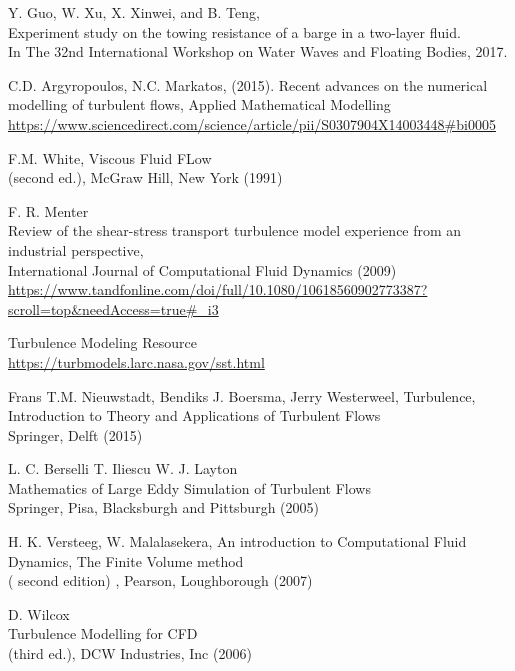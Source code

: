 \documentclass[a4paper, 12pt]{report}
\begin{document}
\begin{thebibliography}{9}
	Y. Guo, W. Xu, X. Xinwei, and B. Teng,\\
	Experiment study on the towing resistance of a barge in a
two-layer fluid.\\
	In The 32nd International Workshop on Water Waves and Floating Bodies, 2017.
	
	C.D. Argyropoulos, N.C. Markatos, (2015).
	Recent advances on the numerical modelling of turbulent flows, Applied Mathematical Modelling \\
	\url{https://www.sciencedirect.com/science/article/pii/S0307904X14003448#bi0005}

	F.M. White,
	Viscous Fluid FLow \\
	(second ed.), McGraw Hill, New York (1991)
	
	 F. R. Menter \\ Review of the shear-stress transport turbulence model experience from an industrial perspective,\\
	International Journal of Computational Fluid Dynamics (2009)\\
	\url{https://www.tandfonline.com/doi/full/10.1080/10618560902773387?scroll=top&needAccess=true#_i3}
	
	Turbulence Modeling Resource \\
	\url{https://turbmodels.larc.nasa.gov/sst.html}

	Frans T.M. Nieuwstadt, Bendiks J. Boersma, Jerry Westerweel,
	Turbulence, Introduction to Theory and Applications
of Turbulent Flows \\
	 Springer, Delft (2015)
	 
     L. C. Berselli T. Iliescu W. J. Layton\\	 
	 Mathematics of Large Eddy Simulation of Turbulent Flows \\
	 Springer, Pisa, Blacksburgh and Pittsburgh (2005)	 
	 
	H. K. Versteeg, W. Malalasekera, An introduction to Computational Fluid Dynamics, The Finite Volume method\\
	 ( second edition) , Pearson, Loughborough (2007)
	 
	 D. Wilcox\\
	 Turbulence Modelling for CFD\\
	(third ed.), DCW Industries, Inc (2006)
	

\end{thebibliography}
\end{document}
